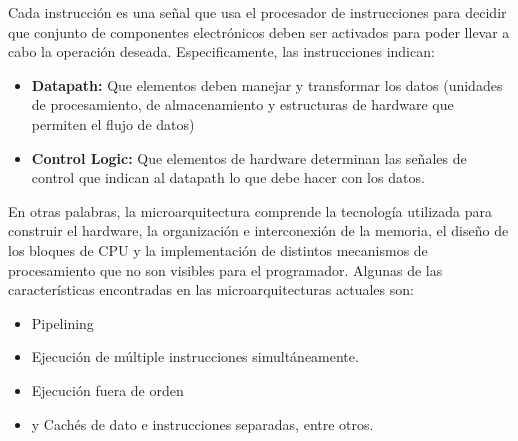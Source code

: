 Cada instrucción es una señal que usa el procesador de instrucciones para decidir que conjunto de componentes electrónicos deben ser activados para poder llevar a cabo la operación deseada. Especificamente, las instrucciones indican: 

\begin{itemize}
	\item \textbf{Datapath:} Que elementos deben manejar y transformar los datos (unidades de procesamiento, de almacenamiento y estructuras de hardware que permiten el flujo de datos)
	\item \textbf{Control Logic:} Que elementos de hardware determinan las señales de control que indican al datapath lo que debe hacer con los datos.
\end{itemize}

En otras palabras, la microarquitectura comprende la tecnología utilizada para construir el hardware, la organización e interconexión de la memoria, el diseño de los bloques de CPU y la implementación de distintos mecanismos de procesamiento que no son visibles para el programador. Algunas de las características encontradas en las microarquitecturas actuales son:

\begin{itemize}
	\item Pipelining
	\item Ejecución de múltiple instrucciones simultáneamente.
	\item Ejecución fuera de orden
	\item y Cachés de dato e instrucciones separadas, entre otros.
\end{itemize}

